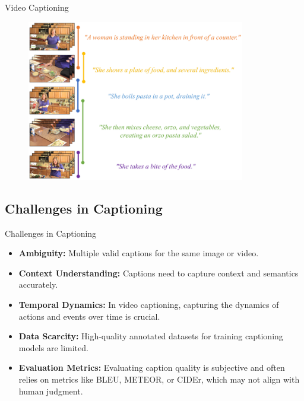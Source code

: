 \begin{frame}[allowframebreaks]{Video Captioning}
\begin{figure}
        \centering
    \end{figure}
\framebreak
    \begin{figure}
        \centering
        \includegraphics[width=0.85\textwidth]{images/vision+text/video-captioning-2.png}
    \end{figure}
\end{frame}

\subsection{Challenges in Captioning}
\begin{frame}[allowframebreaks]{Challenges in Captioning}
    \begin{itemize}
        \item \textbf{Ambiguity:} Multiple valid captions for the same image or video.
        \item \textbf{Context Understanding:} Captions need to capture context and semantics accurately.
        \item \textbf{Temporal Dynamics:} In video captioning, capturing the dynamics of actions and events over time is crucial.
        \item \textbf{Data Scarcity:} High-quality annotated datasets for training captioning models are limited.
        \item \textbf{Evaluation Metrics:} Evaluating caption quality is subjective and often relies on metrics like BLEU, METEOR, or CIDEr, which may not align with human judgment.
    \end{itemize}
\end{frame}
    

